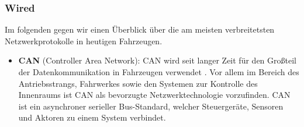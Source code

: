         \subsubsection{Wired}
        Im folgenden gegen wir einen Überblick über die am meisten verbreitetsten Netzwerkprotokolle in heutigen Fahrzeugen. 
            \begin{itemize}
                \item \textbf{CAN} (Controller Area Network): CAN wird seit langer Zeit für den Großteil der Datenkommunikation in Fahrzeugen verwendet \cite{leen1999digital}.
                Vor allem im Bereich des Antriebsstrangs, Fahrwerkes sowie den Systemen zur Kontrolle des Innenraums ist CAN als bevorzugte Netzwerktechnologie vorzufinden.
                CAN ist ein asynchroner serieller Bus-Standard, welcher Steuergeräte, Sensoren und Aktoren zu einem System verbindet. 
                

\end{itemize}
